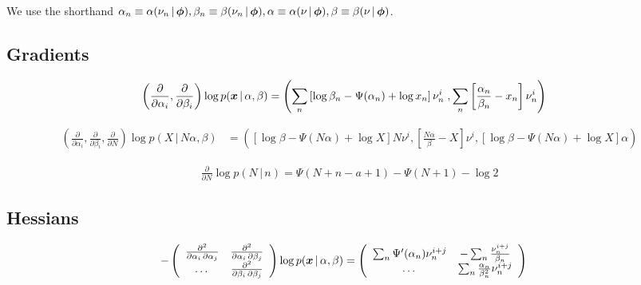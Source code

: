 \documentclass[11pt]{article}
\newcommand{\cond}{\,|\,}
\newcommand{\firstDeriv}[1]{\frac{\partial}{\partial #1}}
\newcommand{\secPartial}[2]{\frac{\partial^2}{\partial #1 \, \partial #2}} %
\begin{document}
We use the shorthand $\alpha_n \equiv \alpha(\nu_n \cond
\bmphi), \beta_n \equiv \beta(\nu_n \cond \bmphi), \alpha \equiv
\alpha(\nu \cond \bmphi), \beta \equiv \beta(\nu \cond \bmphi)$.

\subsection{Gradients} \label{sec:gradients}

\begin{align}
  \label{eq:grad-posterior}
  \left( \firstDeriv{\alpha_i}, \firstDeriv{\beta_i} \right) \log p(\bmx \cond \alpha, \beta) &=
  \left(
    \sum_n \left[ \log \beta_n - \Psi(\alpha_n) + \log x_n \right] \nu_n^i \;,
    \sum_n \left[ \frac{\alpha_n}{\beta_n} - x_n \right]\nu_n^i
  \right)
\end{align}

\begin{align}
  \label{eq:grad-prediction}
  \left( \firstDeriv{\alpha_i}, \firstDeriv{\beta_i}, \firstDeriv{N} \right) \log p(X \cond N \alpha, \beta)  &=
  \left(
    \left[ \log \beta - \Psi(N \alpha) + \log X \right] N \nu^i,
    \left[ \frac{N\alpha}{\beta} - X \right]\nu^i,
    \left[ \log \beta -\Psi(N \alpha) + \log X \right] \alpha
  \right)
\end{align}

\begin{align}
  \label{eq:grad-nb}
  \firstDeriv{N} \log p(N \cond n) = \Psi(N+n-a+1) - \Psi(N+1) - \log 2
\end{align}

\subsection{Hessians} \label{sec:hessians}

\begin{align}
  \label{eq:hess-posterior}
    - \left(
    \begin{array}{ccc}
      \secPartial{\alpha_i}{\alpha_j} & \secPartial{\alpha_i}{\beta_j}\\
      \dots & \secPartial{\beta_i}{\beta_j}
    \end{array}
  \right) \log p(\bmx \cond \alpha, \beta)
    &= \left(
    \begin{array}{cc}
      \sum_n \Psi'(\alpha_n) \nu_n^{i+j} & -\sum_n \frac{\nu_n^{i+j}}{\beta_n}\\
      \dots & \sum_n \frac{\alpha_n}{\beta_n^2} \nu_n^{i+j}
    \end{array}
  \right)
\end{align}
\end{document}

